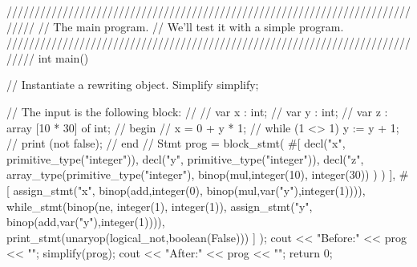 \begin{prop}
/////////////////////////////////////////////////////////////////////////////
//  The main program.
//  We'll test it with a simple program.
/////////////////////////////////////////////////////////////////////////////
int main()
{  
   // Instantiate a rewriting object.
   Simplify simplify;

   // The input is the following block:
   //
   //  var x : int;
   //  var y : int;
   //  var z : array [10 * 30] of int;
   //  begin
   //     x = 0 + y * 1;
   //     while (1 <> 1) y := y + 1;
   //     print (not false);
   //  end
   //
   Stmt prog = 
      block_stmt( #[ decl("x", primitive_type("integer")),
                     decl("y", primitive_type("integer")),
                     decl("z", array_type(primitive_type("integer"),
                                  binop(mul,integer(10), integer(30))
                                         )
                         )
                  ],
                  #[
                   assign_stmt("x", 
                      binop(add,integer(0),
                         binop(mul,var("y"),integer(1)))),
                   while_stmt(binop(ne, integer(1), integer(1)), 
                              assign_stmt("y", 
                                 binop(add,var("y"),integer(1)))),
                   print_stmt(unaryop(logical_not,boolean(False)))
                  ]
                );
   cout << "Before:\n" << prog << "\n\n";
   simplify(prog);
   cout << "After:\n"  << prog << "\n";
   return 0;
}
\end{prop}

